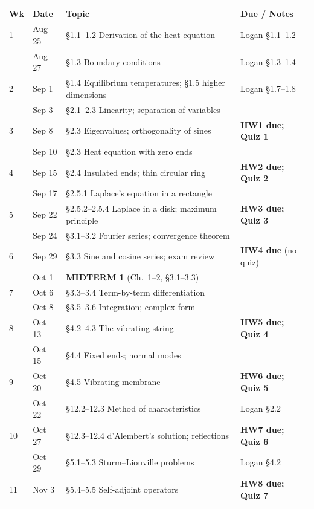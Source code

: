 \documentclass[11pt]{amsart}
\begin{document}
\begin{raggedright}
\begin{longtable}{@{}l l >{\raggedright\arraybackslash}p{2.9in} >{\raggedright\arraybackslash}p{1.35in}@{}}
\hline
\textbf{Wk} & \textbf{Date} & \textbf{Topic} & \textbf{Due / Notes} \\
\hline
\endhead
1  & Aug 25 & \S1.1--1.2 Derivation of the heat equation & Logan \S1.1--1.2 \\
   & Aug 27 & \S1.3 Boundary conditions & Logan \S1.3--1.4 \\
\hline
2  & Sep 1  & \S1.4 Equilibrium temperatures; \S1.5 higher dimensions & Logan \S1.7--1.8 \\
   & Sep 3  & \S2.1--2.3 Linearity; separation of variables & \\
\hline
3  & Sep 8  & \S2.3 Eigenvalues; orthogonality of sines & \textbf{HW1 due; Quiz 1} \\
   & Sep 10 & \S2.3 Heat equation with zero ends & \\
\hline
4  & Sep 15 & \S2.4 Insulated ends; thin circular ring & \textbf{HW2 due; Quiz 2} \\
   & Sep 17 & \S2.5.1 Laplace's equation in a rectangle & \\
\hline
5  & Sep 22 & \S2.5.2--2.5.4 Laplace in a disk; maximum principle & \textbf{HW3 due; Quiz 3} \\
   & Sep 24 & \S3.1--3.2 Fourier series; convergence theorem & \\
\hline
6  & Sep 29 & \S3.3 Sine and cosine series; exam review & \textbf{HW4 due} (no quiz) \\
   & Oct 1  & \textbf{MIDTERM 1} (Ch.\ 1--2, \S3.1--3.3) & \\
\hline
7  & Oct 6  & \S3.3--3.4 Term-by-term differentiation & \\
   & Oct 8  & \S3.5--3.6 Integration; complex form & \\
\hline
8  & Oct 13 & \S4.2--4.3 The vibrating string & \textbf{HW5 due; Quiz 4} \\
   & Oct 15 & \S4.4 Fixed ends; normal modes & \\
\hline
9  & Oct 20 & \S4.5 Vibrating membrane & \textbf{HW6 due; Quiz 5} \\
   & Oct 22 & \S12.2--12.3 Method of characteristics & Logan \S2.2 \\
\hline
10 & Oct 27 & \S12.3--12.4 d'Alembert's solution; reflections & \textbf{HW7 due; Quiz 6} \\
   & Oct 29 & \S5.1--5.3 Sturm--Liouville problems & Logan \S4.2 \\
\hline
11 & Nov 3  & \S5.4--5.5 Self-adjoint operators & \textbf{HW8 due; Quiz 7} \\

\end{longtable}
\end{raggedright}
\end{document}
